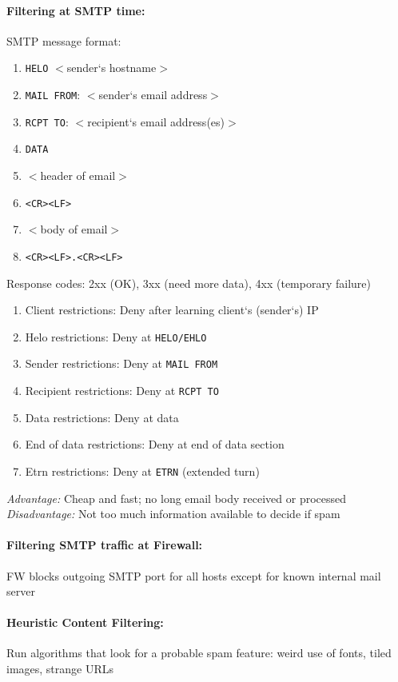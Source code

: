 \paragraph{Filtering at SMTP time:} SMTP message format:
\begin{enumerate}
\item {\tt HELO} $<$sender‘s hostname$>$
\item {\tt MAIL FROM}: $<$sender‘s email address$>$
\item {\tt RCPT TO}: $<$recipient‘s email address(es)$>$
\item {\tt DATA}
\item $<$header of email$>$
\item {\tt <CR><LF>}
\item $<$body of email$>$
\item {\tt <CR><LF>.<CR><LF>}
\end{enumerate}

Response codes: 2xx (OK), 3xx (need more data), 4xx (temporary failure)
\begin{enumerate}
\item Client restrictions: Deny after learning client‘s (sender‘s) IP 
\item Helo restrictions: Deny at {\tt HELO/EHLO}
\item Sender restrictions: Deny at {\tt MAIL FROM}
\item Recipient restrictions: Deny at {\tt RCPT TO}
\item Data restrictions: Deny at data
\item End of data restrictions: Deny at end of data section
\item Etrn restrictions: Deny at {\tt ETRN} (extended turn)
\end{enumerate}

\textit{Advantage:} Cheap and fast; no long email body received or processed \\
\textit{Disadvantage:} Not too much information available to decide if spam

\paragraph{Filtering SMTP traffic at Firewall:} FW blocks outgoing SMTP port for all hosts except for known internal mail server

\paragraph{Heuristic Content Filtering:} Run algorithms that look for a probable spam feature: weird use of fonts, tiled images, strange URLs 


